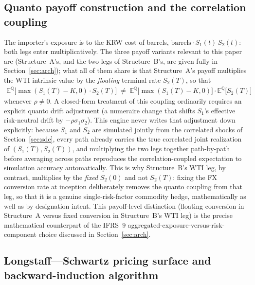 \documentclass[11pt,a4paper]{article}
\begin{document}
\subsection{Quanto payoff construction and the correlation coupling}
\label{sec:quanto}

The importer's exposure is to the KRW cost of barrels, $\mathrm{barrels}\cdot S_1(t)\,S_2(t)$: both legs enter multiplicatively. The three payoff variants relevant to this paper are (Structure~A's, and the two legs of Structure~B's, are given fully in Section~\ref{sec:arch}); what all of them share is that Structure~A's payoff multiplies the WTI intrinsic value by the \emph{floating} terminal rate $S_2(T)$, so that
\begin{align}
\mathbb E^{\mathbb Q}\!\big[\max(S_1(T)-K,0)\cdot S_2(T)\big] \;\ne\; \mathbb E^{\mathbb Q}\!\big[\max(S_1(T)-K,0)\big]\cdot\mathbb E^{\mathbb Q}\!\big[S_2(T)\big]
\end{align}
whenever $\rho\ne 0$. A closed-form treatment of this coupling ordinarily requires an explicit quanto drift adjustment (a numeraire change that shifts $S_1$'s effective risk-neutral drift by $-\rho\sigma_1\sigma_2$). This engine never writes that adjustment down explicitly: because $S_1$ and $S_2$ are simulated jointly from the correlated shocks of Section~\ref{sec:sde}, every path already carries the true correlated joint realization of $(S_1(T),S_2(T))$, and multiplying the two legs together path-by-path before averaging across paths reproduces the correlation-coupled expectation to simulation accuracy automatically. This is why Structure~B's WTI leg, by contrast, multiplies by the \emph{fixed} $S_2(0)$ and not $S_2(T)$: fixing the FX conversion rate at inception deliberately removes the quanto coupling from that leg, so that it is a genuine single-risk-factor commodity hedge, mathematically as well as by designation intent. This payoff-level distinction (floating conversion in Structure~A versus fixed conversion in Structure~B's WTI leg) is the precise mathematical counterpart of the IFRS~9 aggregated-exposure-versus-risk-component choice discussed in Section~\ref{sec:arch}.

\subsection{Longstaff---Schwartz pricing surface and backward-induction algorithm}
\label{sec:lsmc}
\end{document}
